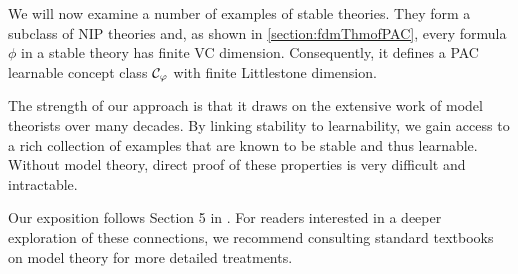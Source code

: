 We will now examine a number of examples of stable theories. They form a subclass of NIP theories and, as shown in \cref{section:fdmThmofPAC}, every formula $\phi$ in a stable theory has finite VC dimension. Consequently, it defines a PAC learnable concept class $\mathcal{C}_\varphi$ with finite Littlestone dimension.

The strength of our approach is that it draws on the extensive work of model theorists over many decades. By linking stability to learnability, we gain access to a rich collection of examples that are known to be stable and thus learnable. Without model theory, direct proof of these properties is very difficult and intractable. 

Our exposition follows Section 5 in \cite{chase2019model}. For readers interested in a deeper exploration of these connections, we recommend consulting standard textbooks on model theory for more detailed treatments.

